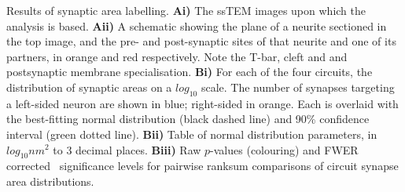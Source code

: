 Results of synaptic area labelling.
\textbf{Ai)} The ssTEM images upon which the analysis is based.
\textbf{Aii)} A schematic showing the plane of a neurite sectioned in the top image, and the pre- and post-synaptic sites of that neurite and one of its partners, in orange and red respectively.
Note the T-bar, cleft and and postsynaptic membrane specialisation.
\textbf{Bi)} For each of the four circuits, the distribution of synaptic areas on a $log_{10}$ scale.
The number of synapses targeting a left-sided neuron are shown in blue; right-sided in orange.
Each is overlaid with the best-fitting normal distribution (black dashed line) and 90\% confidence interval (green dotted line).
\textbf{Bii)} Table of normal distribution parameters, in $log_{10}nm^2$ to 3 decimal places.
\textbf{Biii)} Raw $p$-values (colouring) and FWER corrected~\citep*{Holm1979} significance levels for pairwise ranksum comparisons of circuit synapse area distributions.